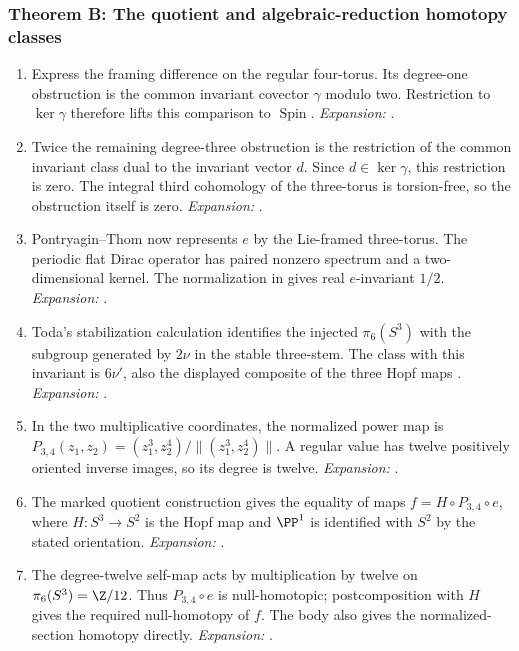 \hypertarget{outline-III-B}{}
\subsubsection*{Theorem B: The quotient and algebraic-reduction homotopy classes}
\begin{enumerate}[label=\arabic*.,leftmargin=*]
\item\hypertarget{step-III-B-1}{} Express the framing difference on the regular four-torus.
Its degree-one obstruction is the common invariant covector $\gamma$
modulo two.  Restriction to $\ker\gamma$ therefore lifts this
comparison to $\operatorname{Spin}$.
\textit{Expansion:} .
\item\hypertarget{step-III-B-2}{} Twice the remaining degree-three obstruction is the restriction
of the common invariant class dual to the invariant vector $d$.
Since $d\in\ker\gamma$, this restriction is zero.  The integral
third cohomology of the three-torus is torsion-free, so the obstruction
itself is zero.
\textit{Expansion:} .
\item\hypertarget{step-III-B-3}{} Pontryagin--Thom now represents $e$ by the Lie-framed
three-torus.  The periodic flat Dirac operator has paired nonzero
spectrum and a two-dimensional kernel.  The normalization in
\cite[Theorem~4.14, p.~423]{mapsAPS2} gives real $e$-invariant $1/2$.
\textit{Expansion:} .
\item\hypertarget{step-III-B-4}{} Toda's stabilization calculation identifies the injected
$\pi_6(S^3)$ with the subgroup generated by $2\nu$ in the stable
three-stem.  The class with this invariant is $6\nu'$, also the
displayed composite of the three Hopf maps
\cite[Theorem~4.1 and Corollaries~4.2--4.3]{mapsToda52}.
\textit{Expansion:} .
\item\hypertarget{step-III-B-5}{} In the two multiplicative coordinates, the normalized power map
is $P_{3,4}(z_1,z_2)=(z_1^3,z_2^4)/\|(z_1^3,z_2^4)\|$.
A regular value has twelve positively oriented inverse images, so its
degree is twelve.
\textit{Expansion:} .
\item\hypertarget{step-III-B-6}{} The marked quotient construction gives the equality of maps
$f=H\circ P_{3,4}\circ e$, where $H:S^3\to S^2$ is the Hopf
map and $\PP^1$ is identified with $S^2$ by the stated orientation.
\textit{Expansion:} .
\item\hypertarget{step-III-B-7}{} The degree-twelve self-map acts by multiplication by twelve on
$\pi_6(S^3)=\Z/12$.  Thus $P_{3,4}\circ e$ is null-homotopic;
postcomposition with $H$ gives the required null-homotopy of $f$.
The body also gives the normalized-section homotopy directly.
\textit{Expansion:} .
\end{enumerate}

